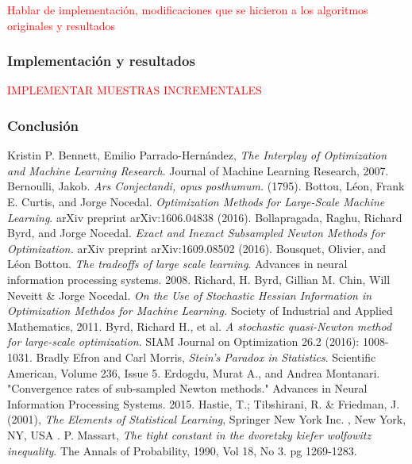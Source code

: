 \documentclass{book}
\theoremstyle{plain}
\theoremstyle{definition}
\theoremstyle{remark}
\begin{document}
\newpage

\textcolor{red}{Hablar de implementación, modificaciones que se hicieron a los algoritmos originales y resultados}



\subsubsection{Implementación y resultados}

\textcolor{red}{IMPLEMENTAR MUESTRAS INCREMENTALES}

\subsubsection{Conclusión}


\begin{thebibliography}{9}
 Kristin P. Bennett, Emilio Parrado-Hernández, \emph{The Interplay of Optimization and Machine Learning Research}. Journal of Machine Learning Research, 2007.
Bernoulli, Jakob. \emph{Ars Conjectandi, opus posthumum.} (1795).
  Bottou, Léon, Frank E. Curtis, and Jorge Nocedal. \emph{Optimization Methods for Large-Scale Machine Learning}. arXiv preprint arXiv:1606.04838 (2016).
Bollapragada, Raghu, Richard Byrd, and Jorge Nocedal. \emph{Exact and Inexact Subsampled Newton Methods for Optimization.} arXiv preprint arXiv:1609.08502 (2016).
Bousquet, Olivier, and Léon Bottou. \emph{The tradeoffs of large scale learning}. Advances in neural information processing systems. 2008.
 Richard, H. Byrd, Gillian M. Chin, Will Neveitt \& Jorge Nocedal.
  \emph{On the Use of Stochastic Hessian Information in Optimization Methdos for Machine Learning.} Society of Industrial and Applied Mathematics, 2011.
 Byrd, Richard H., et al. \emph{A stochastic quasi-Newton method for large-scale optimization}. SIAM Journal on Optimization 26.2 (2016): 1008-1031.
 Bradly Efron and Carl Morris, \emph{Stein's Paradox in Statistics}. Scientific American, Volume 236, Issue 5.
Erdogdu, Murat A., and Andrea Montanari. "Convergence rates of sub-sampled Newton methods." Advances in Neural Information Processing Systems. 2015.
 Hastie, T.; Tibshirani, R. \& Friedman, J. (2001), \emph{The Elements of Statistical Learning}, Springer New York Inc. , New York, NY, USA .
 P. Massart, \emph{The tight constant in the dvoretzky kiefer wolfowitz inequality}. The Annals of Probability, 1990, Vol 18, No 3. pg 1269-1283. 

\end{thebibliography}
\end{document}
